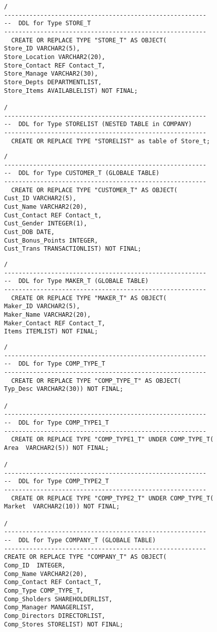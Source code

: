 \documentclass{scrartcl}
\begin{document}
\begin{lstlisting}
/
--------------------------------------------------------
--  DDL for Type STORE_T
--------------------------------------------------------
  CREATE OR REPLACE TYPE "STORE_T" AS OBJECT(
Store_ID VARCHAR2(5),
Store_Location VARCHAR2(20),
Store_Contact REF Contact_T,
Store_Manage VARCHAR2(30),
Store_Depts DEPARTMENTLIST,
Store_Items AVAILABLELIST) NOT FINAL;

/
--------------------------------------------------------
--  DDL for Type STORELIST (NESTED TABLE in COMPANY)
--------------------------------------------------------
  CREATE OR REPLACE TYPE "STORELIST" as table of Store_t;
\end{lstlisting}

\begin{lstlisting}
/
--------------------------------------------------------
--  DDL for Type CUSTOMER_T (GLOBALE TABLE)
--------------------------------------------------------
  CREATE OR REPLACE TYPE "CUSTOMER_T" AS OBJECT(
Cust_ID VARCHAR2(5),
Cust_Name VARCHAR2(20),
Cust_Contact REF Contact_t,
Cust_Gender INTEGER(1),
Cust_DOB DATE,
Cust_Bonus_Points INTEGER,
Cust_Trans TRANSACTIONLIST) NOT FINAL;  
\end{lstlisting}

\begin{lstlisting}
/
--------------------------------------------------------
--  DDL for Type MAKER_T (GLOBALE TABLE)
--------------------------------------------------------
  CREATE OR REPLACE TYPE "MAKER_T" AS OBJECT(
Maker_ID VARCHAR2(5),
Maker_Name VARCHAR2(20),
Maker_Contact REF Contact_T,
Items ITEMLIST) NOT FINAL; 
\end{lstlisting}

\begin{lstlisting}
/
--------------------------------------------------------
--  DDL for Type COMP_TYPE_T
--------------------------------------------------------
  CREATE OR REPLACE TYPE "COMP_TYPE_T" AS OBJECT(
Typ_Desc VARCHAR2(30)) NOT FINAL;

/
--------------------------------------------------------
--  DDL for Type COMP_TYPE1_T
--------------------------------------------------------
  CREATE OR REPLACE TYPE "COMP_TYPE1_T" UNDER COMP_TYPE_T(
Area  VARCHAR2(5)) NOT FINAL;

/
--------------------------------------------------------
--  DDL for Type COMP_TYPE2_T
--------------------------------------------------------
  CREATE OR REPLACE TYPE "COMP_TYPE2_T" UNDER COMP_TYPE_T(
Market  VARCHAR2(10)) NOT FINAL;
  
/
--------------------------------------------------------
--  DDL for Type COMPANY_T (GLOBALE TABLE)
--------------------------------------------------------
CREATE OR REPLACE TYPE "COMPANY_T" AS OBJECT(
Comp_ID  INTEGER,
Comp_Name VARCHAR2(20),
Comp_Contact REF Contact_T,
Comp_Type COMP_TYPE_T,
Comp_Sholders SHAREHOLDERLIST,
Comp_Manager MANAGERLIST,
Comp_Directors DIRECTORLIST,
Comp_Stores STORELIST) NOT FINAL;
\end{lstlisting}
\end{document}
